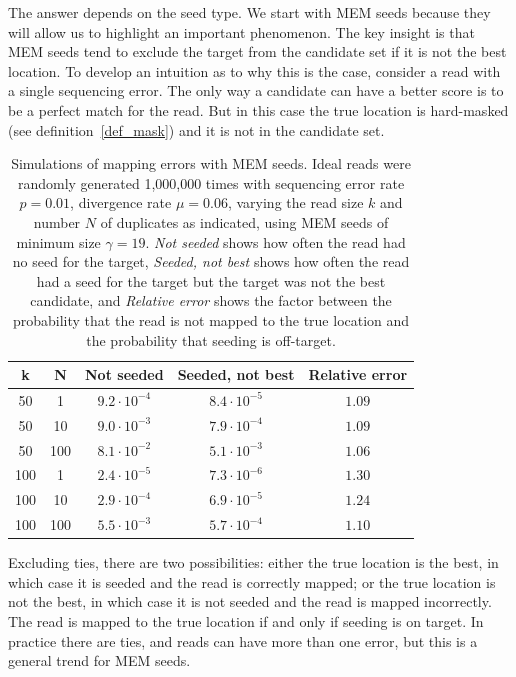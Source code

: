 \documentclass{article}
\begin{document}
The answer depends on the seed type. We start with MEM seeds because they
will allow us to highlight an important phenomenon. The key insight is
that MEM seeds tend to exclude the target from the candidate set if it is
not the best location. To develop an intuition as to why this is the case,
consider a read with a single sequencing error. The only way a candidate
can have a better score is to be a perfect match for the read. But in this
case the true location is hard-masked (see definition~\ref{def_mask}) and
it is not in the candidate set.

\begin{table}
\renewcommand{\arraystretch}{1.1}
\centering
\begin{tabular}{ccccc}
k & N & Not seeded & Seeded, not best & Relative error \\
\hline
50  &  1  & $9.2 \cdot 10^{-4}$ & $8.4 \cdot 10^{-5}$ & $1.09$ \\
50  & 10  & $9.0 \cdot 10^{-3}$ & $7.9 \cdot 10^{-4}$ & $1.09$ \\
50  & 100 & $8.1 \cdot 10^{-2}$ & $5.1 \cdot 10^{-3}$ & $1.06$ \\
100 &  1  & $2.4 \cdot 10^{-5}$ & $7.3 \cdot 10^{-6}$ & $1.30$ \\
100 & 10  & $2.9 \cdot 10^{-4}$ & $6.9 \cdot 10^{-5}$ & $1.24$ \\
100 & 100 & $5.5 \cdot 10^{-3}$ & $5.7 \cdot 10^{-4}$ & $1.10$
\end{tabular}
\caption{Simulations of mapping errors with MEM seeds. Ideal reads were
randomly generated 1,000,000 times with sequencing error rate $p = 0.01$,
divergence rate $\mu = 0.06$, varying the read size $k$ and number $N$ of
duplicates as indicated, using MEM seeds of minimum size $\gamma = 19$.
\textit{Not seeded} shows how often the read had no seed for the target,
\textit{Seeded, not best} shows how often the read had a seed for the
target but the target was not the best candidate, and \textit{Relative
error} shows the factor between the probability that the read is not
mapped to the true location and the probability that seeding is
off-target.}
\label{table_mem}
\end{table}

Excluding ties, there are two possibilities: either the true location is
the best, in which case it is seeded and the read is correctly mapped; or
the true location is not the best, in which case it is not seeded and the
read is mapped incorrectly. The read is mapped to the true location if and
only if seeding is on target. In practice there are ties, and reads can
have more than one error, but this is a general trend for MEM seeds.
\end{document}
